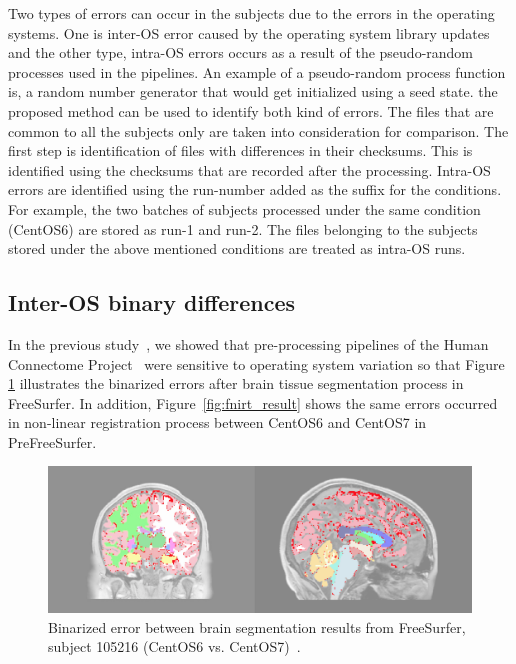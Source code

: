 \documentclass{article}
\begin{document}
{Two types of errors can occur in the subjects due to the 
errors in the operating systems. One is inter-OS error caused by the 
operating system library updates and the other type, intra-OS errors 
occurs as a result of the pseudo-random processes used in the 
pipelines. An example of a pseudo-random process function is, a random 
number generator that would get initialized using a seed state. the 
proposed method can be used to identify both kind of errors. The files 
that are common to all the subjects only are taken into consideration 
for comparison. The first step is identification of files with 
differences in their checksums. This is identified using the checksums 
that are recorded after the processing. Intra-OS errors are identified 
using the run-number added as the suffix for the conditions. For 
example, the two batches of subjects processed under the same condition 
(CentOS6) are stored as run-1 and run-2. The files belonging to the 
subjects stored under the above mentioned conditions are treated as 
intra-OS runs.

\subsection{Inter-OS binary differences}


In the previous study~\cite{Scaria2017}, we showed that pre-processing 
pipelines of the Human Connectome Project~\cite{Glasser2013} were 
sensitive to operating system variation so that Figure 
\ref{fig:tissue_class} illustrates the binarized errors after brain 
tissue segmentation process in FreeSurfer. In addition, 
Figure~\ref{fig:fnirt_result} shows the same errors occurred in 
non-linear registration process between CentOS6 and CentOS7 in PreFreeSurfer. 

\begin{figure}[H]
\centering
  \includegraphics[scale=0.18]{images/brain_classification.png} 
  \caption{Binarized error between brain segmentation results from 
  FreeSurfer, subject 105216 (CentOS6 vs. CentOS7)~\cite{Scaria2017}.
    } 
  \label{fig:tissue_class}
\end{figure}

}
\end{document}

